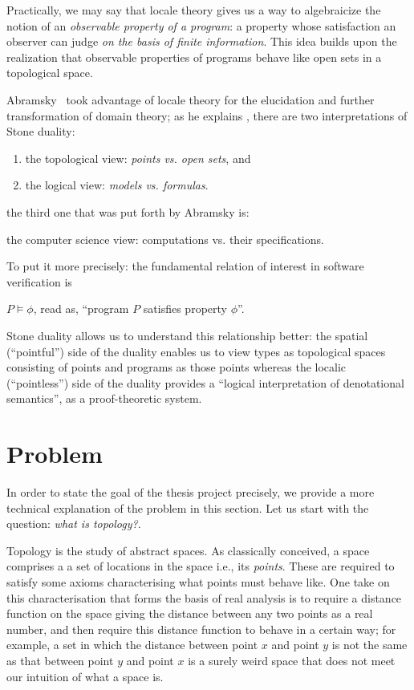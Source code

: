 \documentclass{article}
\begin{document}
Practically, we may say that locale theory gives us a way to algebraicize the notion of an
\emph{observable property of a program}: a property whose satisfaction an observer can
judge \emph{on the basis of finite information}. This idea builds upon the realization
that observable properties of programs behave like open sets in a topological space.

Abramsky~\cite{abramsky:1991} took advantage of locale theory for the elucidation and
further transformation of domain theory; as he explains \cite{abramsky:1991}, there are
two interpretations of Stone duality:
\begin{enumerate}
  \item the topological view: \emph{points vs. open sets}, and
  \item the logical view: \emph{models vs. formulas}.
\end{enumerate}
the third one that was put forth by Abramsky is:
\begin{center}
  the computer science view: computations vs. their specifications.
\end{center}

To put it more precisely: the fundamental relation of interest in software verification is

\begin{center}
  $P \vDash \phi$, \qquad read as, \qquad ``program $P$ satisfies property $\phi$''.
\end{center}

Stone duality allows us to understand this relationship better: the spatial (``pointful'')
side of the duality enables us to view types as topological spaces consisting of points
and programs as those points whereas the localic (``pointless'') side of the duality
provides a ``logical interpretation of denotational semantics'', as a proof-theoretic
system.

\section{Problem}

In order to state the goal of the thesis project precisely, we provide a more technical
explanation of the problem in this section. Let us start with the question:
\emph{what is topology?}.

Topology is the study of abstract spaces. As classically conceived, a space comprises a a
set of locations in the space i.e., its \emph{points}. These are required to satisfy some
axioms characterising what points must behave like. One take on this characterisation that
forms the basis of real analysis is to require a distance function on the space giving the
distance between any two points as a real number, and then require this distance function
to behave in a certain way; for example, a set in which the distance between point $x$ and
point $y$ is not the same as that between point $y$ and point $x$ is a surely weird space
that does not meet our intuition of what a space is.
\end{document}
